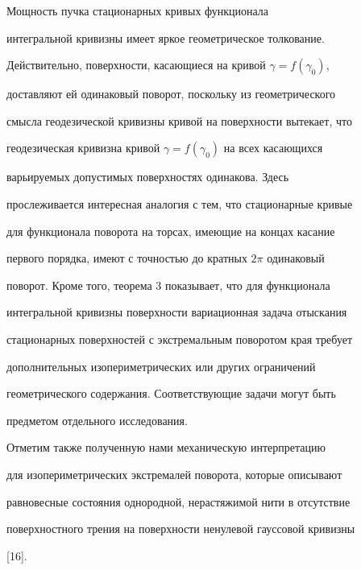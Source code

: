 Мощность пучка стационарных кривых функционала 


интегральной кривизны имеет яркое геометрическое толкование. 


Действительно, поверхности, касающиеся на кривой $\gamma=f(\gamma_0)$, 


доставляют ей одинаковый поворот, поскольку из геометрического 


смысла геодезической кривизны кривой на поверхности вытекает, что 


геодезическая кривизна кривой $\gamma=f(\gamma_0)$ на всех касающихся 


варьируемых допустимых поверхностях одинакова. Здесь 


прослеживается интересная аналогия с тем, что стационарные кривые 


для функционала поворота на торсах, имеющие на концах касание 


первого порядка, имеют с точностью до кратных $2\pi$ одинаковый 


поворот. Кроме того, теорема 3 показывает, что для функционала 


интегральной кривизны поверхности вариационная задача отыскания 


стационарных поверхностей с экстремальным поворотом края требует 


дополнительных изопериметрических или других ограничений 


геометрического содержания. Соответствующие задачи могут быть 


предметом отдельного исследования. 


 


Отметим также полученную нами механическую интерпретацию 


для изопериметрических экстремалей поворота, которые описывают 


равновесные состояния однородной, нерастяжимой нити в отсутствие 


поверхностного трения на поверхности ненулевой гауссовой кривизны 


[16]. 


 


